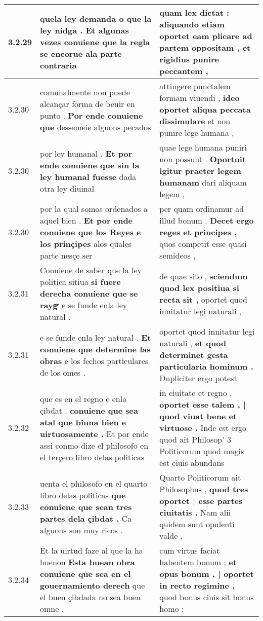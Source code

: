 \begin{tabular}{|p{1cm}|p{6.5cm}|p{6.5cm}|}
3.2.29 & quela ley demanda o que la ley nidga . \textbf{ Et algunas vezes conuiene que la regla se encorue } ala parte contraria & quam lex dictat : \textbf{ aliquando etiam oportet eam plicare ad partem oppositam , } et rigidius punire peccantem , \\\hline
3.2.30 & comunalmente non puede alcançar forma de beuir en punto . \textbf{ Por ende conuiene que } dessemeie alguons pecados & attingere punctalem formam viuendi , \textbf{ ideo oportet aliqua peccata dissimulare } et non punire lege humana , \\\hline
3.2.30 & por ley humanal . \textbf{ Et por ende conuiene que sin la ley humanal fuesse } dada otra ley diuinal & quae lege humana puniri non possunt . \textbf{ Oportuit igitur praeter legem humanam } dari aliquam legem , \\\hline
3.2.30 & por la qual somos ordenados a aquel bien . \textbf{ Et por ende conuiene que los Reyes e los prinçipes } alos quales parte nesçe ser & per quam ordinamur ad illud bonum . \textbf{ Decet ergo reges et principes , } quos competit esse quasi semideos , \\\hline
3.2.31 & Conuiene de saber que la ley politica sitiua \textbf{ si fuere derecha conuiene que se raygͤ } e se funde enla ley natural . & de quae sito , \textbf{ sciendum quod lex positiua si recta sit , } oportet quod innitatur legi naturali , \\\hline
3.2.31 & e se funde enla ley natural . \textbf{ Et conuiene que determine las obras } e los fechos particulares de los omes . & oportet quod innitatur legi naturali , \textbf{ et quod determinet gesta particularia hominum . } Dupliciter ergo potest \\\hline
3.2.32 & que es en el regno e enla çibdat . \textbf{ conuiene que sea atal que biuna bien e uirtuosamente . } Et por ende assi conmo dize el philosofo en el terçero libro delas politicas & in ciuitate et regno , \textbf{ oportet esse talem , | quod viuat bene et virtuose . } Inde est ergo quod ait Philosop’ 3 Politicorum quod magis est ciuis abundans \\\hline
3.2.33 & uenta el philosofo en el quarto libro delas politicas \textbf{ que conuiene que sean tres partes dela çibdat . } Ca alguons son muy ricos . & Quarto Politicorum ait Philosophus , \textbf{ quod tres oportet | esse partes ciuitatis . } Nam alii quidem sunt opulenti valde , \\\hline
3.2.34 & Et la uirtud faze al que la ha buenon \textbf{ Esta buean obra conuiene que sea en el gouernamiento derech } que el buen çibdada no sea buen omne . & cum virtus faciat habentem bonum ; \textbf{ et opus bonum , | oportet in recto regimine , } quod bonus ciuis sit bonus homo ; \\\hline

\end{tabular}
